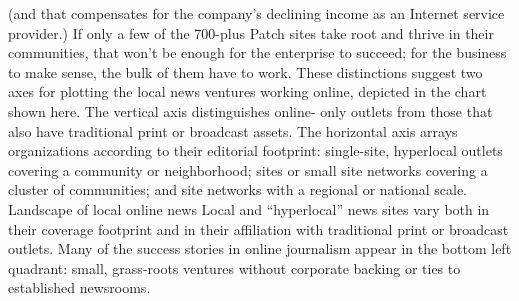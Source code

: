 (and that compensates for the company’s declining income as an Internet service
provider.) If only a few of the 700-plus Patch sites take root and thrive in their
communities, that won’t be enough for the enterprise to succeed; for the business
to make sense, the bulk of them have to work.
These distinctions suggest two axes for plotting the local news ventures working
online, depicted in the chart shown here. The vertical axis distinguishes online-
only outlets from those that also have traditional print or broadcast assets.
The horizontal axis arrays organizations according to their editorial footprint:
single-site, hyperlocal outlets covering a community or neighborhood; sites or
small site networks covering a cluster of communities; and site networks with a
regional or national scale.
Landscape of local online news
Local and ``hyperlocal'' news sites vary both in their coverage footprint and in their
affiliation with traditional print or broadcast outlets. Many of the success stories in
online journalism appear in the bottom left quadrant: small, grass-roots ventures
without corporate backing or ties to established newsrooms.


